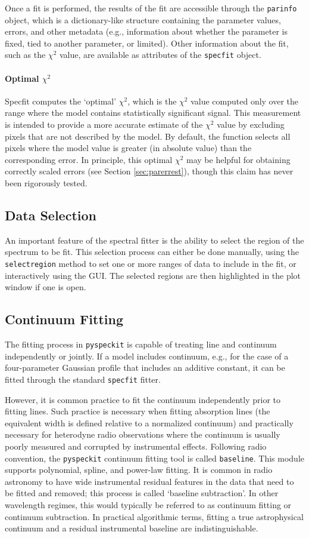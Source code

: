 \documentclass[twocolumn]{aastex63}
\newcommand{\pyspeckit}{\texttt{pyspeckit}\xspace}
\begin{document}
Once a fit is performed, the results of the fit are accessible through the
\texttt{parinfo} object, which is a dictionary-like structure containing
the parameter values, errors, and other metadata (e.g., information about
whether the parameter is fixed, tied to another parameter, or limited).
Other information about the fit, such as the $\chi^2$ value, are available
as attributes of the \texttt{specfit} object.

\paragraph{Optimal $\chi^2$}
Specfit computes the `optimal' $\chi^2$, which is the $\chi^2$
value computed only over the range where the model contains statistically
significant signal.  This measurement is intended to provide a more
accurate estimate of the $\chi^2$ value by excluding pixels that are
not described by the model.  By default, the function selects all pixels where
the model value is greater (in absolute value) than the corresponding error.
In principle, this optimal $\chi^2$ may be helpful for obtaining correctly
scaled errors (see Section \ref{sec:parerrest}), though this claim has never
been rigorously tested.

\subsection{Data Selection}
An important feature of the spectral fitter is the ability to select the region
of the spectrum to be fit.  This selection process can either be done manually,
using the \texttt{selectregion} method to set one or more ranges of data to
include in the fit, or interactively using the GUI.   The selected
regions are then highlighted in the plot window if one is open.

\subsection{Continuum Fitting}
The fitting process in \pyspeckit is capable of treating line and continuum
independently or jointly.  If a model includes continuum, e.g., for the case
of a four-parameter Gaussian profile that includes an additive constant, it
can be fitted through the standard \texttt{specfit} fitter.

However, it is common practice to fit the continuum independently prior to
fitting lines.  Such practice is necessary when fitting absorption lines (the equivalent width is defined relative to a normalized continuum)
and practically necessary for heterodyne radio observations where the
continuum is usually poorly measured and corrupted by instrumental effects.
Following radio convention, the \pyspeckit continuum fitting tool is called
\texttt{baseline}. This module supports polynomial, spline, and power-law
fitting.  It is common in radio astronomy to
have wide instrumental residual features in the data that need to be fitted and
removed; this process is called `baseline subtraction'.  In other wavelength
regimes, this would typically be referred to as continuum fitting or continuum
subtraction.  In practical algorithmic terms, fitting a true astrophysical
continuum and a residual instrumental baseline are indistinguishable.
\end{document}
